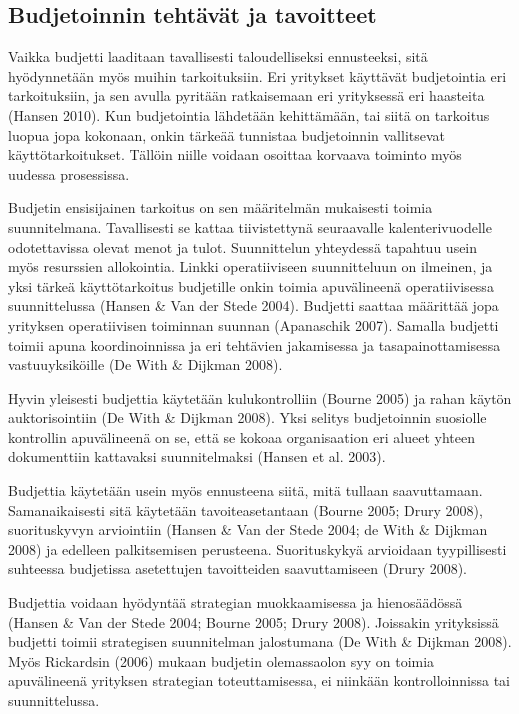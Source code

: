 \documentclass[12pt,a4paper,oneside,pdftex]{report}
\begin{document}
\subsection{Budjetoinnin tehtävät ja tavoitteet}

Vaikka budjetti laaditaan tavallisesti taloudelliseksi ennusteeksi, sitä hyödynnetään myös muihin tarkoituksiin. Eri yritykset käyttävät budjetointia eri tarkoituksiin, ja sen avulla pyritään ratkaisemaan eri yrityksessä eri haasteita (Hansen 2010). Kun budjetointia lähdetään kehittämään, tai siitä on tarkoitus luopua jopa kokonaan, onkin tärkeää tunnistaa budjetoinnin vallitsevat käyttötarkoitukset. Tällöin niille voidaan osoittaa korvaava toiminto myös uudessa prosessissa.

Budjetin ensisijainen tarkoitus on sen määritelmän mukaisesti toimia suunnitelmana. Tavallisesti se kattaa tiivistettynä seuraavalle kalenterivuodelle odotettavissa olevat menot ja tulot. Suunnittelun yhteydessä tapahtuu usein myös resurssien allokointia. Linkki operatiiviseen suunnitteluun on ilmeinen, ja yksi tärkeä käyttötarkoitus budjetille onkin toimia apuvälineenä operatiivisessa suunnittelussa (Hansen & Van der Stede 2004). Budjetti saattaa määrittää jopa yrityksen operatiivisen toiminnan suunnan (Apanaschik 2007). Samalla budjetti toimii apuna koordinoinnissa ja eri tehtävien jakamisessa ja tasapainottamisessa vastuuyksiköille (De With & Dijkman 2008).

Hyvin yleisesti budjettia käytetään kulukontrolliin (Bourne 2005) ja rahan käytön auktorisointiin (De With & Dijkman 2008). Yksi selitys budjetoinnin suosiolle kontrollin apuvälineenä on se, että se kokoaa organisaation eri alueet yhteen dokumenttiin kattavaksi suunnitelmaksi (Hansen et al. 2003).

Budjettia käytetään usein myös ennusteena siitä, mitä tullaan saavuttamaan. Samanaikaisesti sitä käytetään tavoiteasetantaan (Bourne 2005; Drury 2008), suorituskyvyn arviointiin (Hansen & Van der Stede 2004; de With & Dijkman 2008) ja edelleen palkitsemisen perusteena. Suorituskykyä arvioidaan tyypillisesti suhteessa budjetissa asetettujen tavoitteiden saavuttamiseen (Drury 2008).

Budjettia voidaan hyödyntää strategian muokkaamisessa ja hienosäädössä (Hansen & Van der Stede 2004; Bourne 2005; Drury 2008). Joissakin yrityksissä budjetti toimii strategisen suunnitelman jalostumana (De With & Dijkman 2008). Myös Rickardsin (2006) mukaan budjetin olemassaolon syy on toimia apuvälineenä yrityksen strategian toteuttamisessa, ei niinkään kontrolloinnissa tai suunnittelussa.
\end{document}
